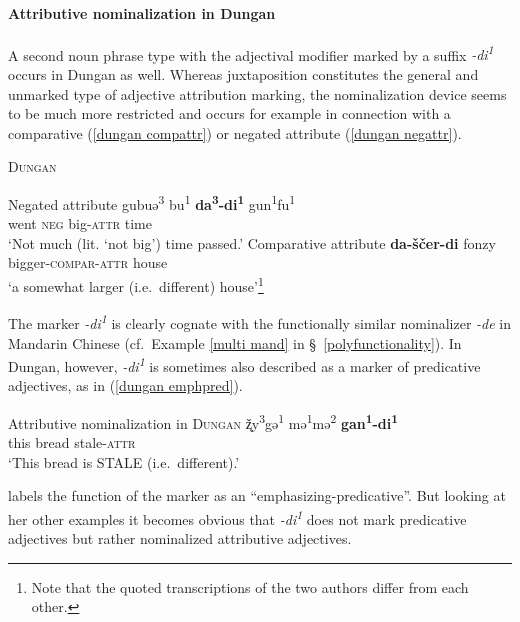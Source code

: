 \paragraph{Attributive nominalization in Dungan}
A second noun phrase type with the adjectival modifier marked by a suffix \textit{-di\textsuperscript{1}} occurs in Dungan as well. Whereas juxtaposition constitutes the general and unmarked type of adjective attribution marking, the nominalization device seems to be much more restricted and occurs for example in connection with a comparative (\ref{dungan compattr}) or negated attribute (\ref{dungan negattr}).
\begin{exe}
\ex \textsc{Dungan}
\begin{xlist}
\ex Negated attribute \cite[80]{zevachina2001} \label{dungan negattr}
\gll	gubuə\textsuperscript{3} bu\textsuperscript{1} \textbf{da\textsuperscript{3}-di\textsuperscript{1}} gun\textsuperscript{1}fu\textsuperscript{1}\\
	went \textsc{neg} big-\textsc{attr} time\\
\glt	‘Not much (lit. ‘not big’) time passed.’
\ex Comparative attribute \cite[480]{kalimov1968} \label{dungan compattr}
\gll	\textbf{da-ščer-di} fonzy\\
	bigger-\textsc{compar}-\textsc{attr} house\\
\glt	‘a somewhat larger (i.e.~different) house’\footnote{Note that the quoted transcriptions of the two authors differ from each other.}
\end{xlist}
\end{exe}	
The marker \textit{-di\textsuperscript{1}} is clearly cognate with the functionally similar nominalizer \textit{-de} in Mandarin Chinese (cf.~Example \ref{multi mand} in \S~\ref{polyfunctionality}). In Dungan, however, \textit{-di\textsuperscript{1}} is sometimes also described as a marker of predicative adjectives, as in (\ref{dungan emphpred}).
\begin{exe}
\ex	Attributive nominalization in \textsc{Dungan} \cite[82]{zevachina2001}
\label{dungan emphpred}
\gll	ž̨y\textsuperscript{3}gə\textsuperscript{1} mə\textsuperscript{1}mə\textsuperscript{2} \textbf{gan\textsuperscript{1}-di\textsuperscript{1}}\\
	this bread stale-\textsc{attr}\\
\glt	‘This bread is STALE (i.e.~different).’
\end{exe}
\citet[82]{zevachina2001} labels the function of the marker as an “emphasizing-predicative”. But looking at her other examples it becomes obvious that \textit{-di\textsuperscript{1}} does not mark predicative adjectives but rather nominalized attributive adjectives.
